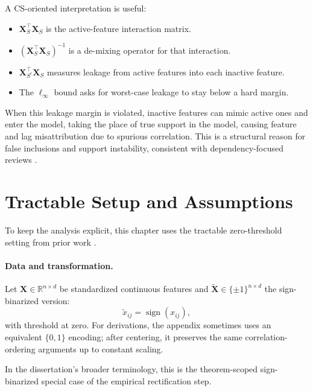A CS-oriented interpretation is useful:
\begin{itemize}
    \item $\mathbf{X}_S^{\top}\mathbf{X}_S$ is the active-feature interaction matrix.
    \item $(\mathbf{X}_S^{\top}\mathbf{X}_S)^{-1}$ is a de-mixing operator for that interaction.
    \item $\mathbf{X}_{S^c}^{\top}\mathbf{X}_S$ measures leakage from active features into each inactive feature.
    \item The $\ell_\infty$ bound asks for worst-case leakage to stay below a hard margin.
\end{itemize}

When this leakage margin is violated, inactive features can mimic active ones and enter the model, taking the place of true support in the model, causing feature and lag misattribution due to spurious correlation. This is a structural reason for false inclusions and support instability, consistent with dependency-focused reviews \autocite{freijeirogonzalez2022}.

\section{Tractable Setup and Assumptions}

To keep the analysis explicit, this chapter uses the tractable zero-threshold setting from prior work \autocite{JOrender2025Efficient}.

\paragraph{Data and transformation.}
Let $\mathbf{X}\in\mathbb{R}^{n\times d}$ be standardized continuous features and $\tilde{\mathbf{X}}\in\{\pm 1\}^{n\times d}$ the sign-binarized version:
\begin{equation}\label{eq:rq2-sign-binarization}
\tilde{x}_{ij}=\operatorname{sign}(x_{ij}),
\end{equation}
with threshold at zero.
For derivations, the appendix sometimes uses an equivalent $\{0,1\}$ encoding; after centering, it preserves the same correlation-ordering arguments up to constant scaling.

In the dissertation's broader terminology, this is the theorem-scoped sign-binarized special case of the empirical rectification step.


